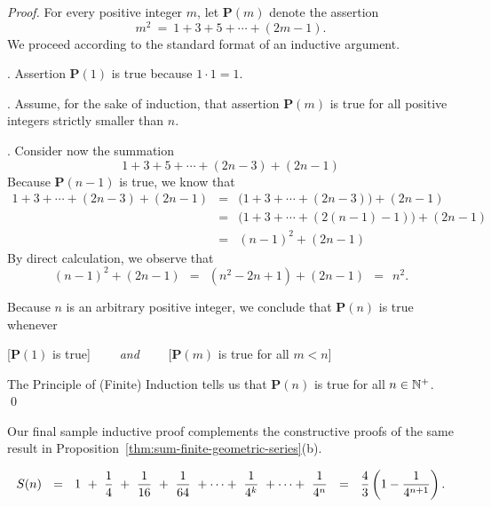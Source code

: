 \begin{proof}
For every positive integer $m$, let {\bf P}$(m)$ denote the assertion
\[ m^2 \ = \ 1 + 3 + 5 + \cdots + (2m-1). \]
We proceed according to the standard format of an inductive argument.

\medskip

.
Assertion {\bf P}$(1)$ is true because $1 \cdot 1 = 1$.

\medskip

.
Assume, for the sake of induction, that assertion {\bf P}$(m)$ is true for all positive integers strictly smaller than $n$.

\medskip

.
Consider now the summation
\[ 1 + 3 + 5 + \cdots + (2n-3) + (2n-1) \]
Because {\bf P}$(n-1)$ is true, we know that
\begin{eqnarray*}
1 + 3 + \cdots + (2n-3) + (2n-1)
  & = & 
\big(1 + 3 + \cdots + (2n-3) \big) + (2n-1) \\
  & = &
\big(1 + 3 + \cdots + (2(n-1) -1) \big) + (2n-1) \\
  & = & (n-1)^2 + (2n-1)
\end{eqnarray*}
By direct calculation, we observe that
\[ (n-1)^2 + (2n-1) \ \ = \ \ (n^2 -2n +1) + (2n-1) \ \ = \ \ n^2. \]

\medskip

\noindent
Because $n$ is an arbitrary positive integer, we conclude that {\bf P}$(n)$ is true whenever

\smallskip

\hspace*{.35in}[{\bf P}$(1)$ is true] \ \ \ \ {\em and} \ \ \ \
[{\bf P}$(m)$ is true for all $m < n$]

\smallskip

\noindent
The Principle of (Finite) Induction tells us that {\bf P}$(n)$ is true for all $n \in \mathbb{N}^+$.  \qed
\end{proof}

\smallskip

Our final sample inductive proof complements the constructive proofs of the same result in 
Proposition~\ref{thm:sum-finite-geometric-series}(b).

\begin{prop}
\label{thm:sumof-1/4-induction}
\[
S(n) \ \ = \ \
1 \ + \ {1 \over 4} \ + \ {1 \over 16} \ + \ {1 \over 64} \ + \cdots + \ {1 \over 4^k } \ + \cdots + \ {1 \over 4^n }
\ \ = \ \  {4 \over 3} \left(1 - {1 \over 4^{n+1}} \right).
\]
\end{prop}


